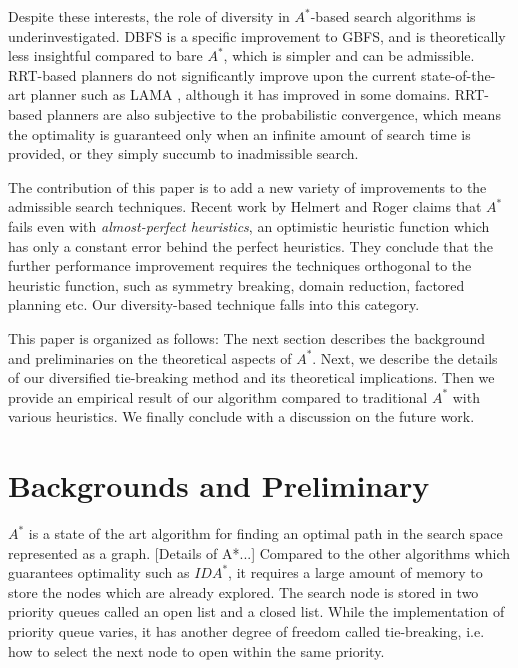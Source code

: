 Despite these interests, the role of diversity in \(A^*\)-based search
algorithms is underinvestigated.
DBFS is a specific improvement to GBFS, and is theoretically less insightful compared
to bare \(A^*\), which is simpler and can be admissible.
RRT-based planners do not significantly improve upon the current
state-of-the-art planner such as LAMA \cite{alcazar2011adapting}, although it
has improved in some domains. RRT-based planners are also subjective to
the probabilistic convergence, which means the optimality is guaranteed
only when an infinite amount of search time is provided, or they simply succumb to
inadmissible search.


The contribution of this paper is to add a new variety of improvements to the admissible search techniques.
Recent work by Helmert and Roger \cite{helmert2008good} claims that \(A^*\) fails even with \emph{almost-perfect heuristics}, an optimistic heuristic function which has only a constant error
behind the perfect heuristics.
They conclude that the further performance improvement requires the
techniques orthogonal to the heuristic function, such as symmetry breaking,
domain reduction, factored planning etc.
Our diversity-based technique falls into this category.

This paper is organized as follows: The next section describes the background and preliminaries on the theoretical aspects of \(A^*\). Next, we describe the details of our diversified tie-breaking method and its theoretical implications.  Then we provide an empirical result of our algorithm compared to traditional \(A^*\) with various heuristics. We finally conclude with a discussion on the future work.

\section{Backgrounds and Preliminary}
\label{sec-1}



$A^*$ is a state of the art algorithm for finding an optimal path in the
search space represented as a graph. [Details of A*...] Compared to the other algorithms which
guarantees optimality such as $IDA^*$, it requires a large amount of memory
to store the nodes which are already explored. The search node is stored in
two priority queues called an open list and a closed list. While the
implementation of priority queue varies, it has another degree of freedom
called tie-breaking, i.e. how to select the next node to open within the
same priority.

